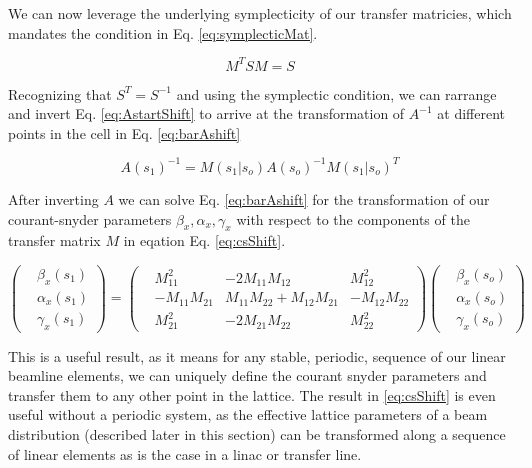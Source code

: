 We can now leverage the underlying symplecticity of our transfer matricies, which mandates the condition in Eq. \ref{eq:symplecticMat}.

\begin{equation} \label{eq:symplecticMat}
	M^T S M = S
\end{equation}

Recognizing that $S^T = S^{-1}$ and using the symplectic condition, we can rarrange and invert Eq. \ref{eq:AstartShift} to arrive at the transformation of $A^{-1}$ at different points in the cell in Eq. \ref{eq:barAshift} 

\begin{equation} \label{eq:barAshift}
	A(s_1)^{-1} = M(s_1|s_o)  A(s_o)^{-1} M(s_1|s_o)^T
\end{equation}

After inverting $A$ we can solve Eq. \ref{eq:barAshift} for the transformation of our courant-snyder parameters $\beta_x, \alpha_x, \gamma_x$ with respect to the components of the transfer matrix $M$ in eqation Eq. \ref{eq:csShift}.

\begin{equation} \label{eq:csShift}
	\begin{pmatrix} &\beta_x(s_1) \\ &\alpha_x(s_1)\\ &\gamma_x(s_1) \end{pmatrix} = 
	\begin{pmatrix}
		&M_{11}^2 &-2 M_{11} M_{12} &M_{12}^2\\
		&-M_{11} M_{21} &M_{11} M_{22} + M_{12} M_{21} &-M_{12}M_{22}\\
		&M_{21}^2 &-2 M_{21} M_{22} &M_{22}^2
	\end{pmatrix}
	\begin{pmatrix} &\beta_x(s_o) \\ &\alpha_x(s_o)\\ &\gamma_x(s_o) \end{pmatrix}
\end{equation}

This is a useful result, as it means for any stable, periodic, sequence of our linear beamline elements, we can uniquely define the courant snyder parameters and transfer them to any other point in the lattice. The result in \ref{eq:csShift} is even useful without a periodic system, as the effective lattice parameters of a beam distribution (described later in this section) can be transformed along a sequence of linear elements as is the case in a linac or transfer line.

